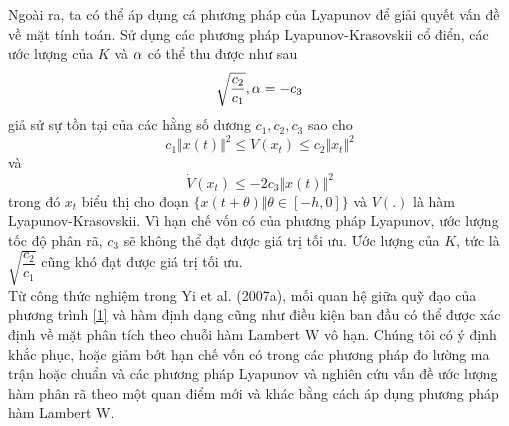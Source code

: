 %
Ngoài ra, ta có thể áp dụng cá phương pháp của Lyapunov để giải
quyết vấn đề về mặt tính toán. Sử dụng các phương pháp Lyapunov-Krasovskii cổ điển, các ước lượng của $K$ và $\alpha$ có thể thu được như sau
%
\begin{equation}\label{5}
	\sqrt{\dfrac{c_2}{c_1}}, \alpha = - c_3
\end{equation}
%
giả sử sự tồn tại của các hằng số dương $c_1, c_2, c_3$ sao cho\\
%
\begin{equation}\label{6}
	c_1 \Vert x(t) \Vert ^2 \le V(x_t) \le c_2 \Vert x_t \Vert ^2
\end{equation}
%
và
%
\begin{equation}\label{7}
	\dot{V}(x_t) \le -2c_3 \Vert x(t) \Vert ^2
\end{equation}
%
trong đó $x_t$ biểu thị cho đoạn $\{x(t+ \theta) \Vert \theta \in [-h, 0]\}$ và $V(.)$ là hàm Lyapunov-Krasovskii. Vì hạn chế vốn có của phương pháp Lyapunov, ước lượng tốc độ phân rã, $c_3$ sẽ không thể đạt được giá trị tối ưu. Ước lượng của $K$, tức là $\sqrt{\dfrac{c_2}{c_1}}$ cũng khó đạt được giá trị tối ưu.\\
%
Từ công thức nghiệm trong Yi et al. (2007a), mối quan hệ giữa quỹ đạo của phương trình \eqref{1} và hàm định dạng cũng như điều kiện ban đầu có thể được xác định về mặt phân tích theo chuỗi hàm Lambert W vô hạn. 
Chúng tôi có ý định khắc phục, hoặc giảm bớt hạn chế vốn có trong các phương pháp đo lường ma trận hoặc chuẩn và các phương pháp Lyapunov và nghiên cứu vấn đề ước lượng hàm phân rã theo một quan điểm mới và khác bằng cách áp dụng phương pháp hàm Lambert W.

